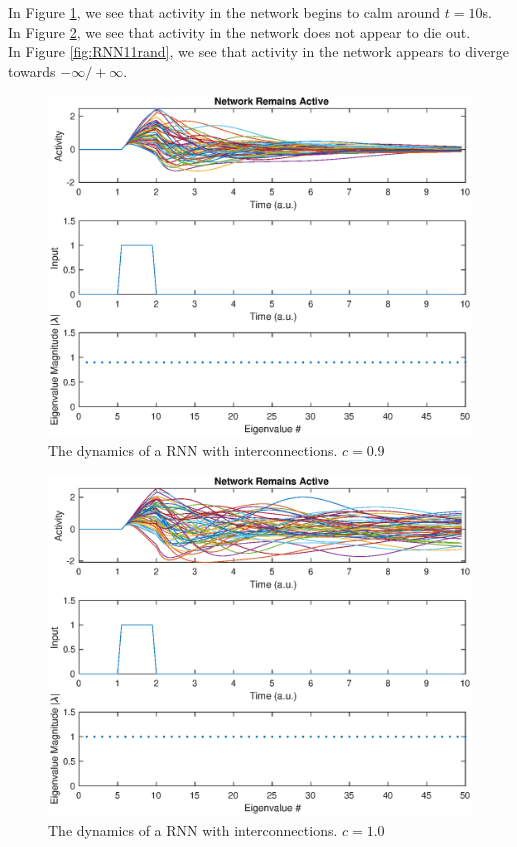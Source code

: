 \documentclass[11pt, oneside]{article}
\begin{document}
In Figure \ref{fig:RNN09rand}, we see that activity in the network begins to calm around $t=10$s. \\
In Figure \ref{fig:RNN10rand}, we see that activity in the network does not appear to die out.\\
In Figure \ref{fig:RNN11rand}, we see that activity in the network appears to diverge towards $-\infty/+\infty$.

\begin{figure}[H]
\includegraphics[width=1\textwidth]{RNN09rand.eps}
\caption{The dynamics of a RNN with interconnections. $c = 0.9$}
\label{fig:RNN09rand}
\end{figure}

\begin{figure}[H]
\includegraphics[width=1\textwidth]{RNN10rand.eps}
\caption{The dynamics of a RNN with interconnections. $c = 1.0$}
\label{fig:RNN10rand}
\end{figure}
\end{document}
